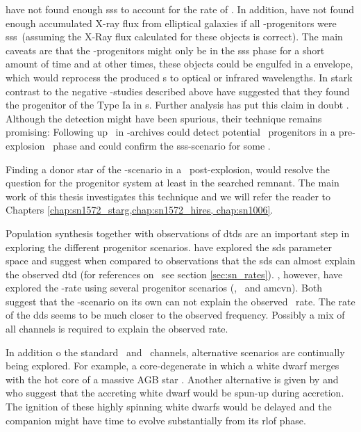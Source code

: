 \cite{2010ApJ...719..474D} have not found enough \gls{sss} to account for the rate of \sneia. In addition, \cite{2010Natur.463..924G} have not found enough accumulated X-ray flux from elliptical galaxies if all \snia-progenitors were \gls{sss}\ (assuming the X-Ray flux calculated for these objects is correct). The main caveats are that the \snia-progenitors might only be in the \gls{sss} phase for a short amount of time and at other times, these objects could be engulfed in a envelope, which would reprocess the produced \xray s to optical or infrared wavelengths. In stark contrast to the negative \xray-studies described above \citet{2008Natur.451..802V} have suggested that they found the progenitor of the Type Ia  in \xray s. Further analysis has put this claim in doubt \citep{2008MNRAS.391..290R}. Although the detection might have been spurious, their technique remains promising: Following up \sneia\ in \xray-archives could detect potential \sneia\ progenitors in a pre-explosion \xray\ phase and could confirm the \gls{sss}-scenario for some \sneia.

Finding a donor star of the \sd-scenario in a \snr\ post-explosion, would resolve the question for the progenitor system at least in the searched remnant. The main work of this thesis investigates this technique and we will refer the reader to Chapters \ref{chap:sn1572_starg,chap:sn1572_hires, chap:sn1006}. 

Population synthesis together with observations of \glspl{dtd} are an important step in exploring the different progenitor scenarios. \citet{2008ApJ...683L.127H, Han:2004p444}  have explored the \gls{sds} parameter space and suggest when compared to observations that the \gls{sds} can almost explain the observed \gls{dtd} (for references on \dtd\ see section \ref{sec:sn_rates}). \citet{2009ApJ...699.2026R, 2010A&A...515A..89M}, however, have explored the \snia-rate using several progenitor scenarios (\sd, \dd\ and \gls{amcvn}). Both suggest that the \sd-scenario on its own can not explain the observed \sneia\ rate. The rate of the \gls{dds} seems to be much closer to the observed frequency. Possibly a mix of all channels is required to explain the observed rate. 


In addition  o the standard \sd\ and \dd\ channels, alternative scenarios are continually being explored. For example, a core-degenerate  in which a white dwarf merges with the hot core of a massive AGB star \citep{2011arXiv1106.2027I}. Another alternative is given by \citet{2011arXiv1102.4342D} and \citet{2011ApJ...730L..34J} who suggest that the accreting white dwarf would be spun-up during accretion. The ignition of these highly spinning white dwarfs would be delayed and the companion might have time to evolve  substantially from its \gls{rlof} phase. 

